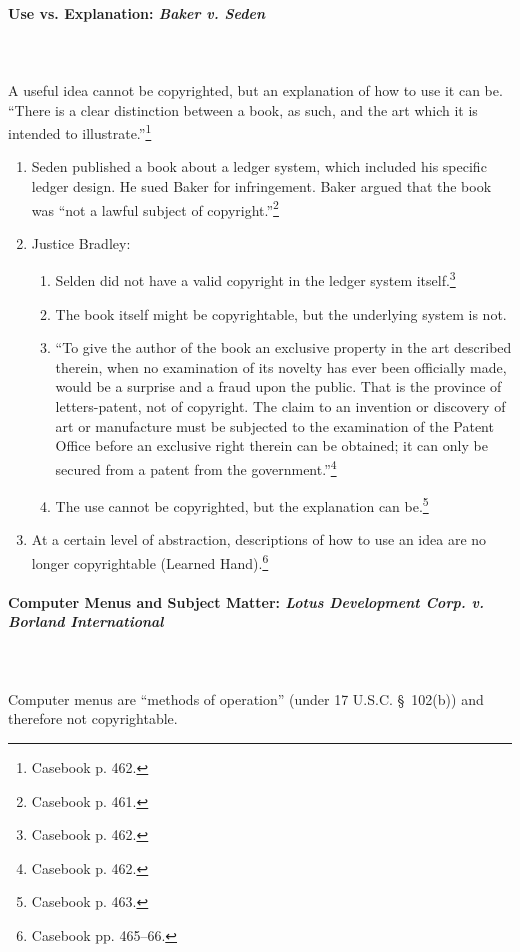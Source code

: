 \paragraph{Use vs. Explanation: \emph{Baker v. Seden}}
~\\\\
A useful idea cannot be copyrighted, but an explanation of how to use it can 
be. ``There is a clear distinction between a book, as such, and the art which 
it is intended to illustrate.''\footnote{Casebook p. 462.}

\begin{enumerate}
    \item Seden published a book about a ledger system, which included his 
    specific ledger design. He sued Baker for infringement. Baker argued that 
    the book was ``not a lawful subject of copyright.''\footnote{Casebook p. 
    461.}
    \item Justice Bradley:
    \begin{enumerate}
        \item Selden did not have a valid copyright in the ledger system 
        itself.\footnote{Casebook p. 462.}
        \item The book itself might be copyrightable, but the underlying 
        system is not.
        \item ``To give the author of the book an exclusive property in the 
        art described therein, when no examination of its novelty has ever 
        been officially made, would be a surprise and a fraud upon the public. 
        That is the province of letters-patent, not of copyright. The claim to 
        an invention or discovery of art or manufacture must be subjected to 
        the examination of the Patent Office before an exclusive right therein 
        can be obtained; it can only be secured from a patent from the 
        government.''\footnote{Casebook p. 462.}
        \item The use cannot be copyrighted, but the explanation can 
        be.\footnote{Casebook p. 463.}
    \end{enumerate}
    \item At a certain level of abstraction, descriptions of how to use an 
    idea are no longer copyrightable (Learned Hand).\footnote{Casebook pp. 
    465--66.}
\end{enumerate}

\paragraph{Computer Menus and Subject Matter: \emph{Lotus Development Corp. v. 
Borland International}}
~\\\\
Computer menus are ``methods of operation'' (under 17 U.S.C. \S\ 102(b)) and 
therefore not copyrightable.

